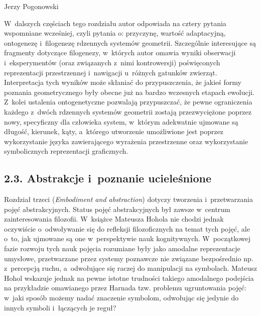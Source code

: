\begin{newrevplenv}{Jerzy Pogonowski}
\begin{enumerate}
\end{enumerate}

W~dalszych częściach tego rozdziału autor odpowiada na cztery
pytania wspomniane wcześniej, czyli pytania o: przyczynę, wartość
adaptacyjną, ontogenezę i~filogenezę rdzennych systemów geometrii.
Szczególnie interesujące są fragmenty dotyczące filogenezy, w~których
autor omawia wyniki obserwacji i~eksperymentów (oraz związanych z~nimi kontrowersji) poświęconych reprezentacji przestrzennej i~nawigacji u~różnych gatunków zwierząt. Interpretacja tych wyników
może skłaniać do przypuszczenia, że jakieś formy poznania
geometrycznego były obecne już na bardzo wczesnych etapach
ewolucji. Z~kolei ustalenia ontogenetyczne pozwalają przypuszczać,
że pewne ograniczenia każdego z~dwóch rdzennych systemów geometrii
zostają przezwyciężone poprzez nowy, specyficzny dla człowieka
system, w~którym adekwatnie ujmowane są długość, kierunek, kąty, a~którego utworzenie umożliwione jest poprzez wykorzystanie języka
zawierającego wyrażenia przestrzenne oraz wykorzystanie
symbolicznych reprezentacji graficznych.

\subsection{2.3. Abstrakcje i~poznanie ucieleśnione}

Rozdział trzeci ({\em Embodiment and abstraction}) dotyczy
tworzenia i~przetwarzania pojęć abstrakcyjnych. Status pojęć
abstrakcyjnych był zawsze w~centrum zainteresowania filozofii. W~książce Mateusza Hohola nie chodzi jednak oczywiście o~odwoływanie
się do refleksji filozoficznych na temat tych pojęć, ale o~to, jak
ujmowane są one w~perspektywie nauk kognitywnych. W~początkowej
fazie rozwoju tych nauk pojęcia rozumiane były jako amodalne
reprezentacje umysłowe, przetwarzane przez systemy poznawcze nie
związane bezpośrednio np. z~percepcją ruchu, a~odwołujące się
raczej do manipulacji na symbolach. Mateusz Hohol wskazuje jednak
na pewne istotne trudności takiego amodalnego podejścia na
przykładzie omawianego przez Harnada tzw. problemu ugruntowania
pojęć: w~jaki sposób możemy nadać znaczenie symbolom, odwołując
się jedynie do innych symboli i~łączących je reguł? 


\end{newrevplenv}
